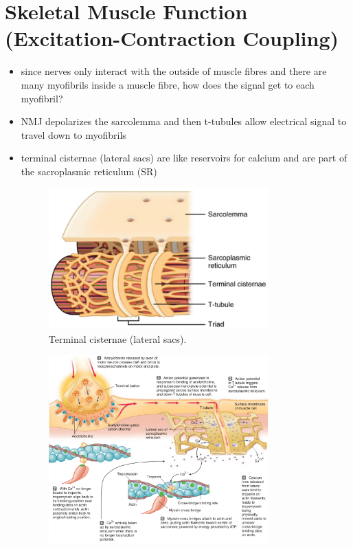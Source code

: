 \documentclass[10pt]{article}
\begin{document}
\section{Skeletal Muscle Function (Excitation-Contraction Coupling)}
\begin{itemize}
    \item since nerves only interact with the outside of muscle fibres and there are many myofibrils inside a muscle fibre, how does the signal get to each myofibril?
    \item NMJ depolarizes the sarcolemma and then t-tubules allow electrical signal to travel down to myofibrils
    \item terminal cisternae (lateral sacs) are like reservoirs for calcium and are part of the sacroplasmic reticulum (SR)
        \begin{figure}[H]
            \centering
            \includegraphics[width=0.8\textwidth]{lateralSacs}
            \caption{Terminal cisternae (lateral sacs).}
            \label{fig:lateralSacs}
        \end{figure}
        \begin{figure}[H]
            \centering
            \includegraphics[width=0.8\textwidth]{molecularMuscleContraction}

\end{figure}
\end{itemize}
\end{document}
